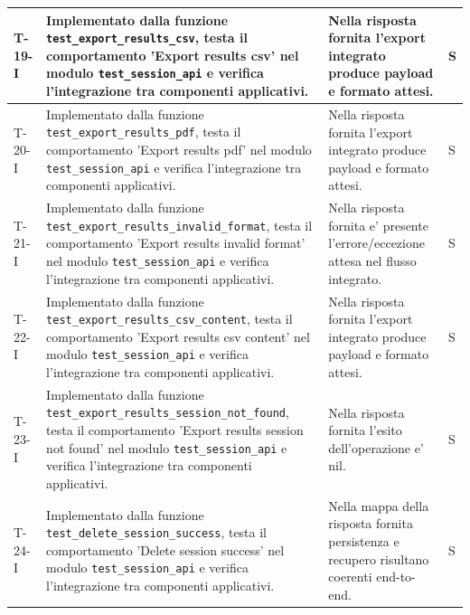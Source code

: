 \documentclass[a4paper,12pt]{article}
\begin{document}
{{\begin{longtable}{|>{\RaggedRight\arraybackslash}p{1.55cm}|>{\RaggedRight\arraybackslash}p{8.0cm}|>{\RaggedRight\arraybackslash}p{4.6cm}|>{\RaggedRight\arraybackslash}p{1.2cm}|}
        \hline
        T-19-I & Implementato dalla funzione \texttt{test\_\allowbreak export\_\allowbreak results\_\allowbreak csv}, testa il comportamento 'Export results csv' nel modulo \texttt{test\_\allowbreak session\_\allowbreak api} e verifica l'integrazione tra componenti applicativi. & Nella risposta fornita l'export integrato produce payload e formato attesi. & S \\
        \hline
        T-20-I & Implementato dalla funzione \texttt{test\_\allowbreak export\_\allowbreak results\_\allowbreak pdf}, testa il comportamento 'Export results pdf' nel modulo \texttt{test\_\allowbreak session\_\allowbreak api} e verifica l'integrazione tra componenti applicativi. & Nella risposta fornita l'export integrato produce payload e formato attesi. & S \\
        \hline
        T-21-I & Implementato dalla funzione \texttt{test\_\allowbreak export\_\allowbreak results\_\allowbreak invalid\_\allowbreak format}, testa il comportamento 'Export results invalid format' nel modulo \texttt{test\_\allowbreak session\_\allowbreak api} e verifica l'integrazione tra componenti applicativi. & Nella risposta fornita e' presente l'errore/eccezione attesa nel flusso integrato. & S \\
        \hline
        T-22-I & Implementato dalla funzione \texttt{test\_\allowbreak export\_\allowbreak results\_\allowbreak csv\_\allowbreak content}, testa il comportamento 'Export results csv content' nel modulo \texttt{test\_\allowbreak session\_\allowbreak api} e verifica l'integrazione tra componenti applicativi. & Nella risposta fornita l'export integrato produce payload e formato attesi. & S \\
        \hline
        T-23-I & Implementato dalla funzione \texttt{test\_\allowbreak export\_\allowbreak results\_\allowbreak session\_\allowbreak not\_\allowbreak found}, testa il comportamento 'Export results session not found' nel modulo \texttt{test\_\allowbreak session\_\allowbreak api} e verifica l'integrazione tra componenti applicativi. & Nella risposta fornita l'esito dell'operazione e' nil. & S \\
        \hline
        T-24-I & Implementato dalla funzione \texttt{test\_\allowbreak delete\_\allowbreak session\_\allowbreak success}, testa il comportamento 'Delete session success' nel modulo \texttt{test\_\allowbreak session\_\allowbreak api} e verifica l'integrazione tra componenti applicativi. & Nella mappa della risposta fornita persistenza e recupero risultano coerenti end-to-end. & S \\

\end{longtable}}}
\end{document}
